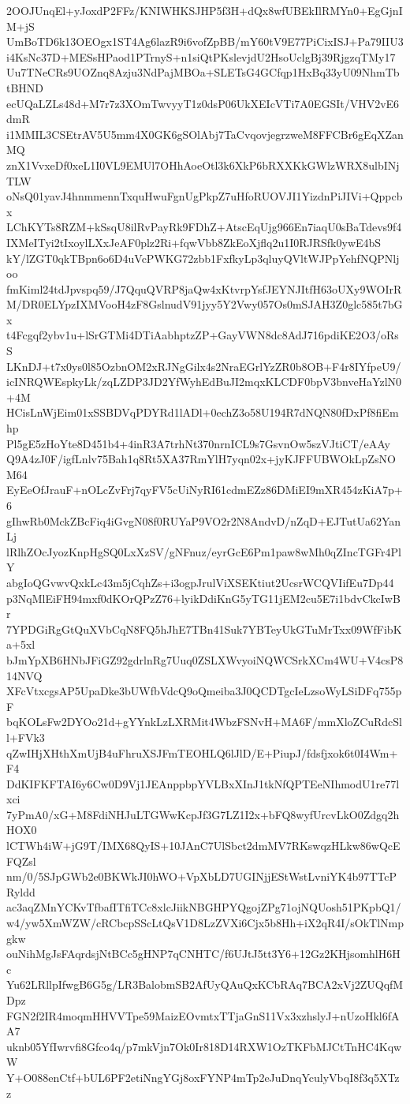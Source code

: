 2OOJUnqEl+yJoxdP2FFz/KNIWHKSJHP5f3H+dQx8wfUBEkIlRMYn0+EgGjnIM+jS
UmBoTD6k13OEOgx1ST4Ag6lazR9i6vofZpBB/mY60tV9E77PiCixISJ+Pa79IIU3
i4KsNc37D+MESsHPaod1PTrnyS+n1siQtPKslevjdU2HsoUclgBj39RjgzqTMy17
Uu7TNeCRs9UOZnq8Azju3NdPajMBOa+SLETsG4GCfqp1HxBq33yU09NhmTbtBHND
ecUQaLZLs48d+M7r7z3XOmTwvyyT1z0dsP06UkXEIcVTi7A0EGSIt/VHV2vE6dmR
i1MMIL3CSEtrAV5U5mm4X0GK6gSOlAbj7TaCvqovjegrzweM8FFCBr6gEqXZanMQ
znX1VvxeDf0xeL1I0VL9EMUl7OHhAoeOtl3k6XkP6bRXXKkGWlzWRX8ulbINjTLW
oNsQ01yavJ4hnmmennTxquHwuFgnUgPkpZ7uHfoRUOVJI1YizdnPiJIVi+Qppcbx
LChKYTs8RZM+kSsqU8ilRvPayRk9FDhZ+AtscEqUjg966En7iaqU0sBaTdevs9f4
IXMeITyi2tIxoylLXxJeAF0plz2Ri+fqwVbb8ZkEoXjflq2u1I0RJRSfk0ywE4bS
kY/lZGT0qkTBpn6o6D4uVcPWKG72zbb1FxfkyLp3qluyQVltWJPpYehfNQPNljoo
fmKiml24tdJpvspq59/J7QquQVRP8jaQw4xKtvrpYsfJEYNJItfH63oUXy9WOIrR
M/DR0ELYpzIXMVooH4zF8GslnudV91jyy5Y2Vwy057Os0mSJAH3Z0glc585t7bGx
t4Fcgqf2ybv1u+lSrGTMi4DTiAabhptzZP+GayVWN8dc8AdJ716pdiKE2O3/oRsS
LKnDJ+t7x0ys0l85OzbnOM2xRJNgGilx4s2NraEGrlYzZR0b8OB+F4r8IYfpeU9/
icINRQWEspkyLk/zqLZDP3JD2YfWyhEdBuJI2mqxKLCDF0bpV3bnveHaYzlN0+4M
HCisLnWjEim01xSSBDVqPDYRd1lADl+0echZ3o58U194R7dNQN80fDxPf8fiEmhp
Pl5gE5zHoYte8D451b4+4inR3A7trhNt370nrnICL9s7GsvnOw5szVJtiCT/eAAy
Q9A4zJ0F/igfLnlv75Bah1q8Rt5XA37RmYlH7yqn02x+jyKJFFUBWOkLpZsNOM64
EyEeOfJrauF+nOLcZvFrj7qyFV5cUiNyRI61cdmEZz86DMiEI9mXR454zKiA7p+6
gIhwRb0MckZBcFiq4iGvgN08f0RUYaP9VO2r2N8AndvD/nZqD+EJTutUa62YanLj
lRlhZOcJyozKnpHgSQ0LxXzSV/gNFnuz/eyrGcE6Pm1paw8wMh0qZIncTGFr4PlY
abgIoQGvwvQxkLc43m5jCqhZs+i3ogpJrulViXSEKtiut2UcsrWCQVIifEu7Dp44
p3NqMlEiFH94mxf0dKOrQPzZ76+lyikDdiKnG5yTG11jEM2cu5E7i1bdvCkcIwBr
7YPDGiRgGtQuXVbCqN8FQ5hJhE7TBn41Suk7YBTeyUkGTuMrTxx09WfFibKa+5xl
bJmYpXB6HNbJFiGZ92gdrlnRg7Uuq0ZSLXWvyoiNQWCSrkXCm4WU+V4csP814NVQ
XFcVtxcgsAP5UpaDke3bUWfbVdcQ9oQmeiba3J0QCDTgcIeLzsoWyLSiDFq755pF
bqKOLsFw2DYOo21d+gYYnkLzLXRMit4WbzFSNvH+MA6F/mmXloZCuRdcSll+FVk3
qZwIHjXHthXmUjB4uFhruXSJFmTEOHLQ6lJlD/E+PiupJ/fdsfjxok6t0I4Wm+F4
DdKIFKFTAI6y6Cw0D9Vj1JEAnppbpYVLBxXInJ1tkNfQPTEeNIhmodU1re77lxci
7yPmA0/xG+M8FdiNHJuLTGWwKcpJf3G7LZ1I2x+bFQ8wyfUrcvLkO0Zdgq2hHOX0
lCTWh4iW+jG9T/IMX68QyIS+10JAnC7UlSbct2dmMV7RKswqzHLkw86wQcEFQZsl
nm/0/5SJpGWb2e0BKWkJI0hWO+VpXbLD7UGINjjEStWstLvniYK4b97TTcPRyldd
ac3aqZMnYCKvTfbafITfiTCc8xlcJiikNBGHPYQgojZPg71ojNQUosh51PKpbQ1/
w4/yw5XmWZW/cRCbcpSScLtQsV1D8LzZVXi6Cjx5b8Hh+iX2qR4I/sOkTlNmpgkw
ouNihMgJsFAqrdsjNtBCc5gHNP7qCNHTC/f6UJtJ5tt3Y6+12Gz2KHjsomhlH6Hc
Yu62LRllpIfwgB6G5g/LR3BalobmSB2AfUyQAuQxKCbRAq7BCA2xVj2ZUQqfMDpz
FGN2f2IR4moqmHHVVTpe59MaizEOvmtxTTjaGnS11Vx3xzhslyJ+nUzoHkl6fAA7
uknb05YfIwrvfi8Gfco4q/p7mkVjn7Ok0Ir818D14RXW1OzTKFbMJCtTnHC4KqwW
Y+O088enCtf+bUL6PF2etiNngYGj8oxFYNP4mTp2eJuDnqYculyVbqI8f3q5XTzz
